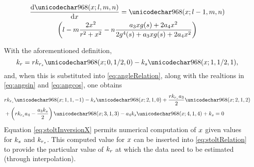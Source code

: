 \begin{multline}
 \frac{\d\shelp{l}{m}{n}}{\d\xang} = \shelp{l-1}{m}{n}\\
 \left(l-m\frac{2\xang^2}{\targetrange^2+\xang^2} - n\frac{\rcoeff_3\xang\gfunc(\xparm) + 2\rcoeff_4\xang^2}{2\gfunc^4(\xparm) + \rcoeff_3\xang\gfunc(\xparm) + 2\rcoeff_4\xang^2}\right)
\end{multline}
\par
With the aforementioned definition,
\begin{equation}
 \kr = \targetrange\krstolt\shelp{0}{1/2}{0} - \kparm\shelp{1}{1/2}{1},
 \label{eq:stoltRelation}
\end{equation}
and, when this is substituted into \eqref{eq:angleRelation}, along with the realtions in \eqref{eq:angsin} and \eqref{eq:angcos}, one obtains
\begin{equation}
\begin{split}
 &\targetrange\krstolt\shelp{1}{1}{-1} - \kparm\shelp{2}{1}{0}
 +\frac{\targetrange\krstolt\rcoeff_3}{2}\shelp{2}{1}{2}\\
 &+\left(\targetrange\krstolt\rcoeff_4-\frac{\rcoeff_3\kparm}{2}\right)\shelp{3}{1}{3}
 - \rcoeff_4\kparm\shelp{4}{1}{4} + \kparm = 0
\end{split}
\label{eq:stoltInversionX}
\end{equation}
Equation \ref{eq:stoltInversionX} permits numerical computation of $x$ given values for $k_{s}$ and $k_{r_s}$. This computed value for $x$ can be inserted into \ref{eq:stoltRelation} to provide the particular value of $k_r$ at which the data need to be estimated (through interpolation).
